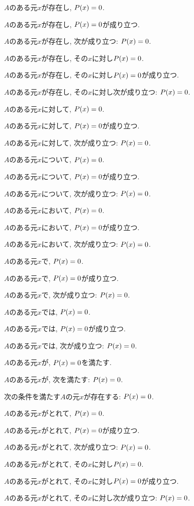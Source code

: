 \item $A$のある元$x$が存在し, $P(x)=0$.
\item $A$のある元$x$が存在し, $P(x)=0$が成り立つ.
\item $A$のある元$x$が存在し, 次が成り立つ: $P(x)=0$.
\item $A$のある元$x$が存在し, その$x$に対し$P(x)=0$.
\item $A$のある元$x$が存在し, その$x$に対し$P(x)=0$が成り立つ.
\item $A$のある元$x$が存在し, その$x$に対し次が成り立つ: $P(x)=0$.
\item $A$のある元$x$に対して, $P(x)=0$.
\item $A$のある元$x$に対して, $P(x)=0$が成り立つ.
\item $A$のある元$x$に対して, 次が成り立つ: $P(x)=0$.
\item $A$のある元$x$について, $P(x)=0$.
\item $A$のある元$x$について, $P(x)=0$が成り立つ.
\item $A$のある元$x$について, 次が成り立つ: $P(x)=0$.
\item $A$のある元$x$において, $P(x)=0$.
\item $A$のある元$x$において, $P(x)=0$が成り立つ.
\item $A$のある元$x$において, 次が成り立つ: $P(x)=0$.
\item $A$のある元$x$で, $P(x)=0$.
\item $A$のある元$x$で, $P(x)=0$が成り立つ.
\item $A$のある元$x$で, 次が成り立つ: $P(x)=0$.
\item $A$のある元$x$では, $P(x)=0$.
\item $A$のある元$x$では, $P(x)=0$が成り立つ.
\item $A$のある元$x$では, 次が成り立つ: $P(x)=0$.
\item $A$のある元$x$が, $P(x)=0$を満たす.
\item $A$のある元$x$が, 次を満たす: $P(x)=0$.
\item 次の条件を満たす$A$の元$x$が存在する: $P(x)=0$.
\item $A$のある元$x$がとれて, $P(x)=0$.
\item $A$のある元$x$がとれて, $P(x)=0$が成り立つ.
\item $A$のある元$x$がとれて, 次が成り立つ: $P(x)=0$.
\item $A$のある元$x$がとれて, その$x$に対し$P(x)=0$.
\item $A$のある元$x$がとれて, その$x$に対し$P(x)=0$が成り立つ.
\item $A$のある元$x$がとれて, その$x$に対し次が成り立つ: $P(x)=0$.
